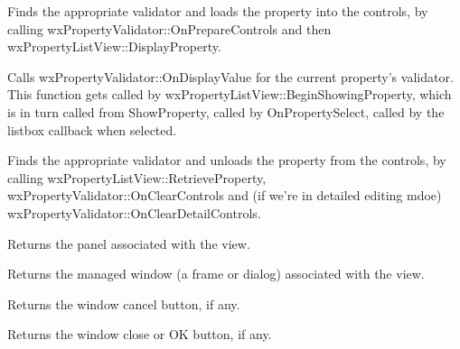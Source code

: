 Finds the appropriate validator and loads the property into the controls, by calling
wxPropertyValidator::OnPrepareControls and then wxPropertyListView::DisplayProperty.

\label{wxpropertylistviewdisplayproperty}


Calls wxPropertyValidator::OnDisplayValue for the current property's validator. This function
gets called by wxPropertyListView::BeginShowingProperty, which is in turn called
from ShowProperty, called by OnPropertySelect, called by the listbox callback when selected.

\label{wxpropertylistviewendshowingproperty}


Finds the appropriate validator and unloads the property from the controls, by calling
wxPropertyListView::RetrieveProperty, wxPropertyValidator::OnClearControls and (if we're in
detailed editing mdoe) wxPropertyValidator::OnClearDetailControls.

\label{wxpropertylistviewgetpanel}


Returns the panel associated with the view.

\label{wxpropertylistviewgetmanagedwindow}


Returns the managed window (a frame or dialog) associated with the view.

\label{wxpropertylistviewgetwindowcancelbutton}


Returns the window cancel button, if any.

\label{wxpropertylistviewgetwindowclosebutton}


Returns the window close or OK button, if any.

\label{wxpropertylistviewgetwindowhelpbutton}

